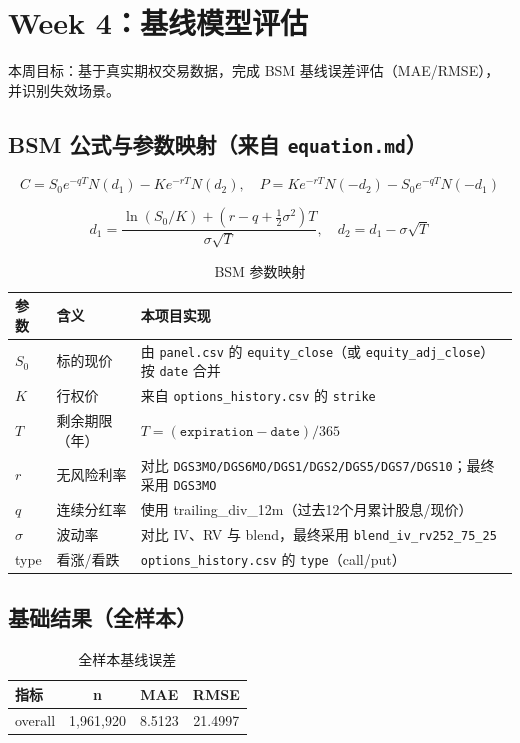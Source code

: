 \documentclass[11pt]{article}
\begin{document}


\section{Week 4：基线模型评估}

本周目标：基于真实期权交易数据，完成 BSM 基线误差评估（MAE/RMSE），并识别失效场景。

\subsection{BSM 公式与参数映射（来自 \texttt{equation.md}）}

\[
C = S_0 e^{-qT}N(d_1)-Ke^{-rT}N(d_2), \quad
P = Ke^{-rT}N(-d_2)-S_0 e^{-qT}N(-d_1)
\]

\[
d_1=\frac{\ln(S_0/K)+(r-q+\tfrac{1}{2}\sigma^2)T}{\sigma\sqrt{T}}, \quad
d_2=d_1-\sigma\sqrt{T}
\]

\begin{table}[H]
  \centering
  \renewcommand{\arraystretch}{1.12}
  \begin{tabularx}{\textwidth}{l l X}
    \toprule
    参数 & 含义 & 本项目实现 \\
    \midrule
    $S_0$ & 标的现价 & 由 \texttt{panel.csv} 的 \texttt{equity\_close}（或 \texttt{equity\_adj\_close}）按 \texttt{date} 合并 \\
    $K$ & 行权价 & 来自 \texttt{options\_history.csv} 的 \texttt{strike} \\
    $T$ & 剩余期限（年） & $T=(\texttt{expiration}-\texttt{date})/365$ \\
    $r$ & 无风险利率 & 对比 \texttt{DGS3MO/DGS6MO/DGS1/DGS2/DGS5/DGS7/DGS10}；最终采用 \texttt{DGS3MO} \\
    $q$ & 连续分红率 & 使用 trailing\_div\_12m（过去12个月累计股息/现价） \\
    $\sigma$ & 波动率 & 对比 IV、RV 与 blend，最终采用 \texttt{blend\_iv\_rv252\_75\_25} \\
    type & 看涨/看跌 & \texttt{options\_history.csv} 的 \texttt{type}（call/put） \\
    \bottomrule
  \end{tabularx}
  \caption{BSM 参数映射}
\end{table}

\subsection{基础结果（全样本）}

\begin{table}[H]
  \centering
  \begin{tabular}{lccc}
    \toprule
    指标 & n & MAE & RMSE \\
    \midrule
    overall & 1,961,920 & 8.5123 & 21.4997 \\
    \bottomrule
  \end{tabular}
  \caption{全样本基线误差}
\end{table}
\end{document}
